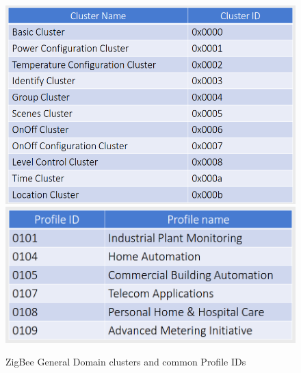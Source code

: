 \begin{paracol}{2}
   \begin{figure}[htbp]
      \centering
      \includegraphics{images/zigbee_generalclusters.png}\\
      \includegraphics{images/zigbee_appprofiles.png}
      \caption{ZigBee General Domain clusters and common Profile IDs}
      \label{fig:zigbee_generalclusters}
   \end{figure}
\end{paracol}

